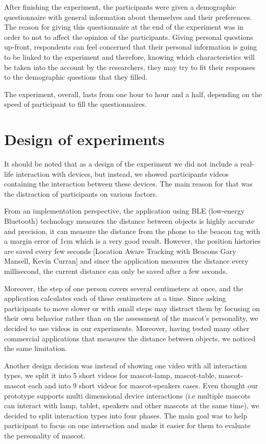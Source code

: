 After finishing the experiment, the participants were given a demographic questionnaire
with general information about themselves and their preferences.
The reason for giving this questionnaire at the end of the experiment was in order
to not to affect the opinion of the participants.
Giving personal questions up-front, respondents can feel concerned that their personal
information is going to be linked to the experiment and therefore, knowing which
characteristics will be taken into the account by the researchers, they may try
to fit their responses to the demographic questions that they filled.
\par The experiment, overall, lasts from one hour to hour and a half, depending
on the speed of participant to fill the questionnaires.

\section{Design of experiments}
\label{sec:design-of-experiments}
\par It should be noted that as a design of the experiment we did not include a
real-life interaction with devices, but instead, we showed participants videos
containing the interaction between these devices.
The main reason for that was the distraction of participants on various factors.
\par From an implementation perspective, the application using BLE (low-energy Bluetooth)
technology measures the distance between objects is highly accurate and precision,
it can measure the distance from the phone to the beacon tag with a margin error of 1cm which is a very good result.
However, the position histories are saved every few seconds [Location Aware Tracking with Beacons Gary Mansell, Kevin Curran] and
since the application measures the distance every millisecond, the current distance can only be saved after a few seconds.
\par Moreover, the step of one person covers several centimeters at once, and the
application calculates each of these centimeters at a time.
Since asking participants to move slower or with small steps may distract
them by focusing on their own behavior rather than on the assessment of the
mascot's personality, we decided to use videos in our experiments.
Moreover, having tested many other commercial applications that measures the distance between objects,
we noticed the same limitation.
\par Another design decision was instead of showing one video with all interaction types,
we split it into 5 short videos for mascot-lamp, mascot-table, mascot-mascot each
and into 9 short videos for mascot-speakers cases.
Even thought our prototype supports multi dimensional device interactions
(i.e multiple mascots can interact with lamp, tablet, speakers and other mascots at the same time),
we decided to split interaction types into four phases.
The main goal was to help participant to focus on one interaction and make
it easier for them to evaluate the personality of mascot.

